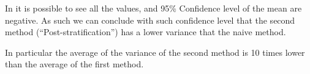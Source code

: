 \documentclass[10pt,a4paper]{article}
\begin{document}
In  it is possible to see all the values, and 95\% Confidence level of the mean are negative. As such we can conclude with such confidence level that the second method (``Post-stratification'') has a lower variance that the naive method.

In particular the average of the variance of the second method is 10 times lower than the average of the first method.
\end{document}
